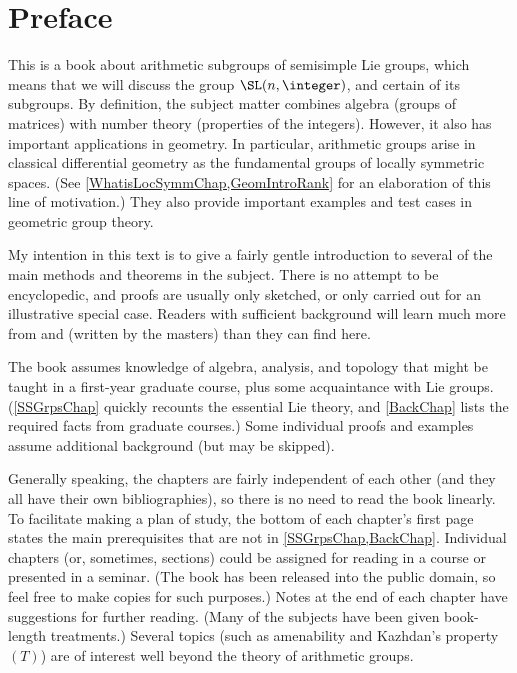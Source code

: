 

\chapter*{Preface}
\label{Preface}

This is a book about arithmetic subgroups of semisimple Lie groups, which means that we will discuss the group $\SL(n,\integer)$, and certain of its subgroups. By definition, the subject matter combines algebra (groups of matrices) with number theory (properties of the integers). However, it also has important applications in geometry. In particular, arithmetic groups arise in classical differential geometry as the fundamental groups of locally symmetric spaces. (See \cref{WhatisLocSymmChap,GeomIntroRank} for an elaboration of this line of motivation.) They also provide important examples and test cases in geometric group theory.

My intention in this text is to give a fairly gentle introduction to several of the main methods and theorems in the subject. There is no attempt to be encyclopedic, and proofs are usually only sketched, or only carried out for an illustrative special case. 
Readers with sufficient background will learn much more from \cite{MargulisBook} and \cite{PlatonovRapinchukBook} (written by the masters) than they can find here.

 
The book assumes knowledge of algebra, analysis, and topology that might be taught in a first-year graduate course, plus some acquaintance with Lie groups. (\cref{SSGrpsChap} quickly recounts the essential Lie theory, and \cref{BackChap} lists the required facts from graduate courses.) Some individual proofs and examples assume additional background (but may be skipped).

Generally speaking, the chapters are fairly independent of each other (and they all have their own bibliographies), so there is no need to read the book linearly.
To facilitate making a plan of study, the bottom of each chapter's first page states the main prerequisites that are not in \cref{SSGrpsChap,BackChap}.
Individual chapters (or, sometimes, sections) could be assigned for reading in a course or presented in a seminar. 
(The book has been released into the public domain, so feel free to make copies for such purposes.) Notes at the end of each chapter have suggestions for further reading. (Many of the subjects have been given book-length treatments.)
 Several topics (such as amenability and Kazhdan's property~$(T)$) are of interest well beyond the theory of arithmetic groups. 

